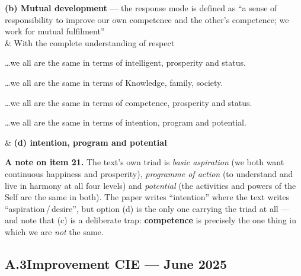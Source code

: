 \begin{objtable}
  \textbf{(b) Mutual development} --- the response mode is defined as
  ``a sense of responsibility to improve our own competence and the other's
  competence; we work for mutual fulfilment''  \\ \hline
{} & With the complete understanding of respect
  \begin{optlist}
  \item \ldots we all are the same in terms of intelligent, prosperity and
        status.
  \item \ldots we all are the same in terms of Knowledge, family, society.
  \item \ldots we all are the same in terms of competence, prosperity and
        status.
  \item \ldots we all are the same in terms of intention, program and
        potential.
  \end{optlist} &
  \textbf{(d) intention, program and potential}  \\ \hline
\end{objtable}

\begin{note}
\textbf{\sffamily A note on item 21.} The text's own triad is \emph{basic
aspiration} (we both want continuous happiness and prosperity),
\emph{programme of action} (to understand and live in harmony at all four
levels) and \emph{potential} (the activities and powers of the Self are the
same in both). The paper writes ``intention'' where the text writes
``aspiration\,/\,desire'', but option (d) is the only one carrying the triad
at all --- and note that (c) is a deliberate trap: \textbf{competence} is
precisely the one thing in which we are \emph{not} the same.
\end{note}

\subsection*{A.3\enspace Improvement CIE --- June 2025}

